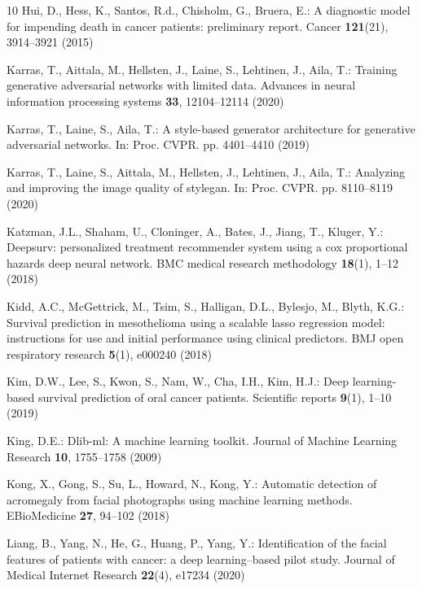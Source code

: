 \documentclass[runningheads]{llncs}
\begin{document}
\begin{thebibliography}{10}
Hui, D., Hess, K., Santos, R.d., Chisholm, G., Bruera, E.: A diagnostic model
  for impending death in cancer patients: preliminary report. Cancer
  \textbf{121}(21),  3914--3921 (2015)

Karras, T., Aittala, M., Hellsten, J., Laine, S., Lehtinen, J., Aila, T.:
  Training generative adversarial networks with limited data. Advances in
  neural information processing systems  \textbf{33},  12104--12114 (2020)

Karras, T., Laine, S., Aila, T.: A style-based generator architecture for
  generative adversarial networks. In: Proc. CVPR. pp. 4401--4410 (2019)

Karras, T., Laine, S., Aittala, M., Hellsten, J., Lehtinen, J., Aila, T.:
  Analyzing and improving the image quality of stylegan. In: Proc. CVPR. pp.
  8110--8119 (2020)

Katzman, J.L., Shaham, U., Cloninger, A., Bates, J., Jiang, T., Kluger, Y.:
  Deepsurv: personalized treatment recommender system using a cox proportional
  hazards deep neural network. BMC medical research methodology
  \textbf{18}(1),  1--12 (2018)

Kidd, A.C., McGettrick, M., Tsim, S., Halligan, D.L., Bylesjo, M., Blyth, K.G.:
  Survival prediction in mesothelioma using a scalable lasso regression model:
  instructions for use and initial performance using clinical predictors. BMJ
  open respiratory research  \textbf{5}(1),  e000240 (2018)

Kim, D.W., Lee, S., Kwon, S., Nam, W., Cha, I.H., Kim, H.J.: Deep
  learning-based survival prediction of oral cancer patients. Scientific
  reports  \textbf{9}(1),  1--10 (2019)

King, D.E.: Dlib-ml: A machine learning toolkit. Journal of Machine Learning
  Research  \textbf{10},  1755--1758 (2009)

Kong, X., Gong, S., Su, L., Howard, N., Kong, Y.: Automatic detection of
  acromegaly from facial photographs using machine learning methods.
  EBioMedicine  \textbf{27},  94--102 (2018)

Liang, B., Yang, N., He, G., Huang, P., Yang, Y.: Identification of the facial
  features of patients with cancer: a deep learning--based pilot study. Journal
  of Medical Internet Research  \textbf{22}(4),  e17234 (2020)


\end{thebibliography}
\end{document}
